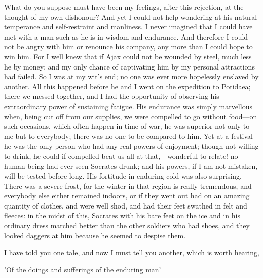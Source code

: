 \para[150] What do you suppose must have been my feelings, after this rejection, at the thought of my own dishonour? And yet I could not help wondering at his natural temperance and self-restraint and manliness. I never imagined that I could have met with a man such as he is in wisdom and endurance. And therefore I could not be angry with him or renounce his company, any more than I could hope to win him. For I well knew that if Ajax could not be wounded by steel, much less he by money; and my only chance of captivating him by my personal attractions had failed. So I was at my wit's end; no one was ever more hopelessly enslaved by another. All this happened before he and I went on the expedition to Potidaea; there we messed together, and I had the opportunity of observing his extraordinary power of sustaining fatigue. His endurance was simply marvellous when, being cut off from our supplies, we were compelled to go without food---on such occasions, which often happen in time of war, he was superior not only to me but to everybody; there was no one to be compared to him. Yet at a festival he was the only person who had any real powers of enjoyment; though not willing to drink, he could if compelled beat us all at that,---wonderful to relate! no human being had ever seen Socrates drunk; and his powers, if I am not mistaken, will be tested before long. His fortitude in enduring cold was also surprising. There was a severe frost, for the winter in that region is really tremendous, and everybody else either remained indoors, or if they went out had on an amazing quantity of clothes, and were well shod, and had their feet swathed in felt and fleeces: in the midst of this, Socrates with his bare feet on the ice and in his ordinary dress marched better than the other soldiers who had shoes, and they looked daggers at him because he seemed to despise them.

\para[151] I have told you one tale, and now I must tell you another, which is worth hearing,

\para[152] 'Of the doings and sufferings of the enduring man'

